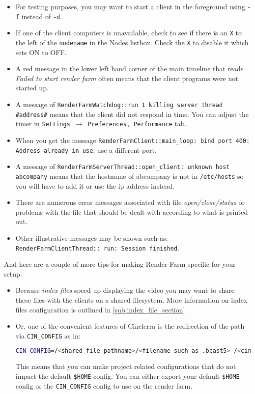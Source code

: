\begin{itemize}
    \item For testing purposes, you may want to start a client in the foreground using \texttt{-f} instead of \texttt{-d}.
    \item If one of the client computers is unavailable, check to see if there is an \texttt{X} to the left of the \texttt{nodename}
    in the Nodes listbox.  Check the \texttt{X} to disable it which sets ON to OFF.
    \item A red message in the lower left hand corner of the main timeline that reads \textit{Failed to start render
    farm} often means that the client \CGG{} programs were not started up.
    \item A message of \texttt{RenderFarmWatchdog::run 1 killing server thread \\ \#address\#} means that the client did
    not respond in time.  You can adjust the timer in \texttt{Settings $\rightarrow$ Preferences, Performance} tab.
    \item When you get the message \texttt{RenderFarmClient::main\_loop: bind port 400: Address already in use}, use a different port.
    \item A message of \texttt{RenderFarmServerThread::open\_client: unknown host abcompany} means that the
    hostname of abcompany is not in \texttt{/etc/hosts} so you will have to add it or use the ip address instead.
    \item There are numerous error messages associated with file \textit{open/close/status} or problems with the file
    that should be dealt with according to what is printed out.
    \item Other illustrative messages may be shown such as: \texttt{RenderFarmClientThread:: run: Session finished}.
\end{itemize}

And here are a couple of more tips for making Render Farm specific for your setup.
\begin{itemize}
    \item Because \textit{index files} speed up displaying the video you may want to share these files
with the clients on a shared filesystem. More information on index files configuration is outlined in
\ref{sub:index_file_section}.
    \item Or, one of the convenient features of Cinelerra is the redirection of the path
 via \texttt{CIN\_CONFIG} as in:
\begin{lstlisting}[language=bash,numbers=none]
CIN_CONFIG=/<shared_file_pathname>/<filename_such_as_.bcast5> /<cinelerra_pathname>/cin
\end{lstlisting}
This means that you can make project related configurations that do not impact the default \texttt{\$HOME} config.  You can either export your default \texttt{\$HOME} config or the \texttt{CIN\_CONFIG} config to use on the render farm.
\end{itemize}

